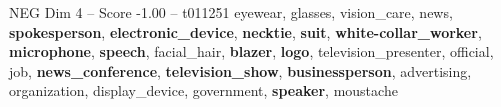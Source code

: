 \begin{textsample}{NEG Dim 4 – Score -1.00 – t011251}  \label{ex:f4_neg_038}
eyewear, glasses, vision\_care, news, \textbf{spokesperson}, \textbf{electronic\_device}, \textbf{necktie}, \textbf{suit}, \textbf{white-collar\_worker}, \textbf{microphone}, \textbf{speech}, facial\_hair, \textbf{blazer}, \textbf{logo}, television\_presenter, official, job, \textbf{news\_conference}, \textbf{television\_show}, \textbf{businessperson}, advertising, organization, display\_device, government, \textbf{speaker}, moustache

\end{textsample}
